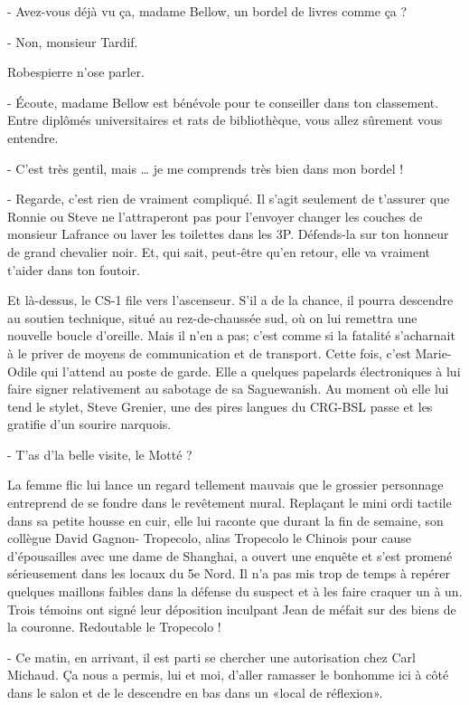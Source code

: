 - Avez-vous déjà vu ça, madame Bellow, un bordel de livres comme ça ?

- Non, monsieur Tardif.

Robespierre n’ose parler.

- Écoute, madame Bellow est bénévole pour te conseiller dans ton classement. Entre diplômés universitaires et rats de bibliothèque, vous allez sûrement vous entendre.

- C’est très gentil, mais … je me comprends très bien dans mon bordel !

- Regarde, c’est rien de vraiment compliqué. Il s’agit seulement de t’assurer que Ronnie ou Steve ne l’attraperont pas pour l’envoyer changer les couches de monsieur Lafrance ou laver les toilettes dans les 3P. Défends-la sur ton honneur de grand chevalier noir. Et, qui sait, peut-être qu’en retour, elle va vraiment t’aider dans ton foutoir.

Et là-dessus, le CS-1 file vers l’ascenseur. S’il a de la chance, il pourra descendre au soutien technique, situé au rez-de-chaussée sud, où on lui remettra une nouvelle boucle d’oreille. Mais il n’en a pas; c’est comme si la fatalité s’acharnait à le priver de moyens de communication et de transport. Cette fois, c’est Marie-Odile qui l’attend au poste de garde. Elle a quelques papelards électroniques à lui faire signer relativement au sabotage de sa Saguewanish. Au moment où elle lui tend le stylet, Steve Grenier, une des pires langues du CRG-BSL passe et les gratifie d’un sourire narquois.

- T’as d’la belle visite, le Motté ?

La femme flic lui lance un regard tellement mauvais que le grossier personnage entreprend de se fondre dans le revêtement mural. Replaçant le mini ordi tactile dans sa petite housse en cuir, elle lui raconte que durant la fin de semaine, son collègue David Gagnon- Tropecolo, alias Tropecolo le Chinois pour cause d’épousailles avec une dame de Shanghai, a ouvert une enquête et s’est promené sérieusement dans les locaux du 5e Nord. Il n’a pas mis trop de temps à repérer quelques maillons faibles dans la défense du suspect et à les faire craquer un à un. Trois témoins ont signé leur déposition inculpant Jean de méfait sur des biens de la couronne. Redoutable le Tropecolo !

- Ce matin, en arrivant, il est parti se chercher une autorisation chez Carl Michaud. Ça nous a permis, lui et moi, d’aller ramasser le bonhomme ici à côté dans le salon et de le descendre en bas dans un «local de réflexion».

